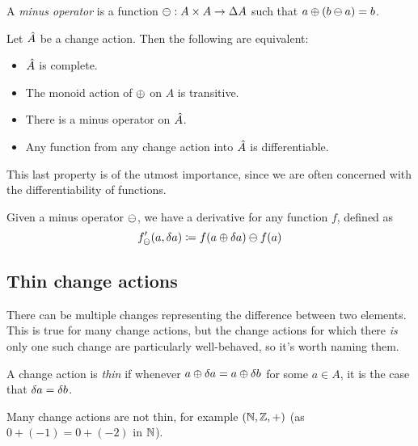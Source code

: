 \begin{defn}
  A \emph{minus operator} is a function $\ominus: A \times A \rightarrow \Delta A$ such that $a \oplus (b \ominus a) = b$.
\end{defn}

\begin{prop}
  Let $\hat{A}$ be a change action. Then the following are equivalent:
  \begin{itemize}
    \item $\hat{A}$ is complete.
    \item The monoid action of $\oplus$ on $A$ is transitive.
    \item There is a minus operator on $\hat{A}$.
    \item Any function from any change action into $\hat{A}$ is differentiable.
  \end{itemize}
\end{prop}

This last property is of the utmost importance, since we are often concerned with the differentiability
of functions.

\begin{defn}
  Given a minus operator $\ominus$, we have a derivative for any function $f$,
  defined as
  \begin{displaymath}
    f'_\ominus(a, \delta a) \coloneqq f(a \oplus \delta a) \ominus f(a)
  \end{displaymath}
\end{defn}

\subsection{Thin change actions}
\label{sec:thin}

There can be multiple changes representing the difference
between two elements. This is true for many change actions, but the change
actions for which there \emph{is} only one such change are particularly
well-behaved, so it's worth naming them.

\begin{defn}
  A change action is \emph{thin} if whenever $a \oplus \delta a
  = a \oplus \delta b$ for some $a \in A$, it is the case that $\delta a = \delta b$.
\end{defn}

Many change actions are not thin, for example $(\mathbb{N},\mathbb{Z},+)$ (as $0 + (-1)
= 0 + (-2)$ in $\mathbb{N}$).

